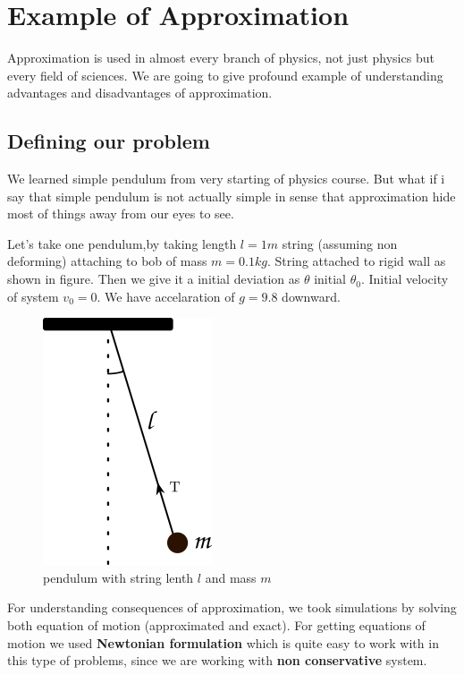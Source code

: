 \documentclass{article}
\begin{document}
\section{Example of Approximation}
\label{sec:orga9fb35e}

Approximation is used in almost every branch of physics, not just physics but every field of sciences. We are going to give profound example of understanding advantages and disadvantages of approximation.

\subsection{Defining our problem}
\label{sec:org4128a9d}

We learned simple pendulum from very starting of physics course. But what if i say that simple pendulum is not actually simple in sense that approximation hide most of things away from our eyes to see.

Let's take one pendulum,by taking length \(l = 1 m\) string (assuming non deforming) attaching to bob of mass \(m = 0.1 kg\). String attached to rigid wall as shown in figure. Then we give it a initial deviation as \(\theta\) initial \(\theta_{0}\). Initial velocity of system \(v_{0}=0\). We have accelaration of \(g=9.8\) downward.

\begin{figure}[htbp]
\centering
\includegraphics[width=0.3 \textwidth]{../extras/figure1.png}
\caption{\label{fig:orgd66fdb2}pendulum with string lenth \(l\) and mass \(m\)}
\end{figure}

For understanding consequences of approximation, we took simulations by solving both equation of motion (approximated and exact). For getting equations of motion we used \textbf{Newtonian formulation} which is quite easy to work with in this type of problems, since we are working with \textbf{non conservative} system.
\end{document}
